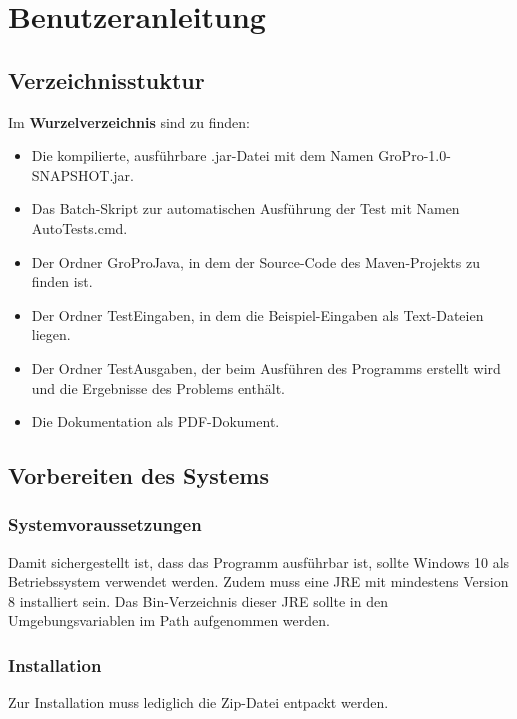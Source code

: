 \chapter{Benutzeranleitung}\label{ch:benutzeranleitung}

\section{Verzeichnisstuktur}\label{sec:verzeichnisstruktur}
Im \textbf{Wurzelverzeichnis} sind zu finden:
\begin{itemize}[noitemsep]
    \item Die kompilierte, ausführbare .jar-Datei mit dem Namen \glqq GroPro-1.0-\\SNAPSHOT.jar\grqq{}.
    \item Das Batch-Skript zur automatischen Ausführung der Test mit Namen \glqq AutoTests.cmd\grqq{}.
    \item Der Ordner \glqq GroProJava\grqq{}, in dem der Source-Code des Maven-Projekts zu finden ist.
    \item Der Ordner \glqq TestEingaben\grqq{}, in dem die Beispiel-Eingaben als Text-Dateien liegen.
    \item Der Ordner \glqq TestAusgaben\grqq{}, der beim Ausführen des Programms erstellt wird und die Ergebnisse des Problems enthält.
    \item Die Dokumentation als PDF-Dokument.
\end{itemize}


\section{Vorbereiten des Systems}\label{sec:vorbereiten-des-systems}

\subsection{Systemvoraussetzungen}\label{subsec:systemvoraussetzungen}
Damit sichergestellt ist, dass das Programm ausführbar ist, sollte Windows 10 als Betriebssystem verwendet werden.
Zudem muss eine JRE mit mindestens Version 8 installiert sein.
Das Bin-Verzeichnis dieser JRE sollte in den Umgebungsvariablen im Path aufgenommen werden.

\subsection{Installation}\label{subsec:installation}
Zur Installation muss lediglich die Zip-Datei entpackt werden.

